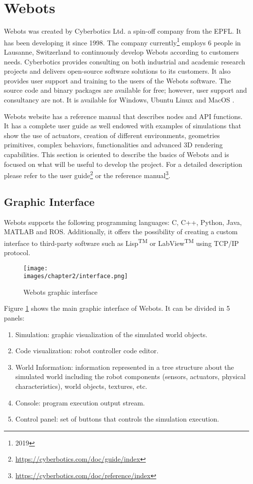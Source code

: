 \section{Webots}
Webots was created by Cyberbotics Ltd. a spin-off company from the EPFL. It has been developing it since 1998. The company currently\footnote{2019} employs 6 people in Lausanne, Switzerland to continuously develop Webots according to customers needs. Cyberbotics provides consulting on both industrial and academic research projects and delivers open-source software solutions to its customers. It also provides user support and training to the users of the Webots software. The source code and binary packages are available for free; however, user support and consultancy are not. It is available for Windows, Ubuntu Linux and MacOS \cite{cyberbotics}.

Webots website has a reference manual that describes nodes and API functions. It has a complete user guide as well endowed with examples of simulations that show the use of actuators, creation of different environments, geometries primitives, complex behaviors, functionalities and advanced 3D rendering capabilities. This section is oriented to describe the basics of Webots and is focused on what will be useful to develop the project. For a detailed description please refer to the user guide\footnote{\url{https://cyberbotics.com/doc/guide/index}} or the reference manual\footnote{\url{https://cyberbotics.com/doc/reference/index}}.

\subsection{Graphic Interface}
Webots supports the following programming languages: C, C++, Python, Java, MATLAB and ROS. Additionally, it offers the possibility of creating a custom interface to third-party software such as Lisp\textsuperscript{TM} or LabView\textsuperscript{TM} using TCP/IP protocol.

\begin{figure}[h]
	\texttt{[image: \\images/chapter2/interface.png]}
	\caption{Webots graphic interface}
	\label{fig-ch-2:interface}
\end{figure}

Figure \ref{fig-ch-2:interface} shows the main graphic interface of Webots. It can be divided in 5 panels:

\begin{enumerate}
	\item Simulation: graphic visualization of the simulated world objects.
	\item Code visualization: robot controller code editor.
	\item World Information: information represented in a tree structure about the simulated world including the robot components (sensors, actuators, physical characteristics), world objects, textures, etc. 
	\item Console: program execution output stream.
	\item Control panel: set of buttons that controls the simulation execution.
\end{enumerate}

